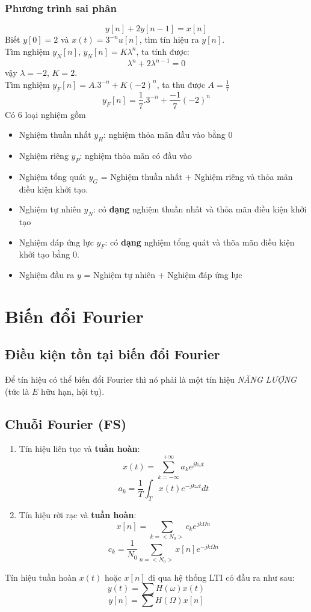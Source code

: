 \documentclass{article}
\begin{document}
\subsubsection{Phương trình sai phân}
$$y[n]+2y[n-1]=x[n]$$
Biết $y[0]=2$ và $x(t)=3^{-n}u[n]$, tìm tín hiệu ra $y[n]$.
\\Tìm nghiệm $y_{N}[n]$, $y_{N}[n]=K\lambda^{n}$, ta tính được:
$$\lambda^{n}+2\lambda^{n-1}=0$$
vậy $\lambda=-2$, $K=2$.
\\Tìm nghiệm $y_{F}[n]=A.3^{-n}+K(-2)^n$, ta thu được $A=\frac{1}{7}$
$$y_{F}[n]=\frac{1}{7}.3^{-n}+\frac{-1}{7}(-2)^n$$
Có 6 loại nghiệm gồm
\begin{itemize}
    \item Nghiệm thuần nhất $y_{H}$: nghiệm thỏa mãn đầu vào bằng $0$
    \item Nghiệm riêng $y_{P}$: nghiệm thỏa mãn có đầu vào
    \item Nghiệm tổng quát $y_{G}$ = Nghiệm thuần nhất + Nghiệm riêng và thỏa mãn điều kiện khởi tạo.
    \item Nghiệm tự nhiên $y_{N}$: có \textbf{dạng} nghiệm thuần nhất và thỏa mãn điều kiện khởi tạo
    \item Nghiệm đáp ứng lực $y_{F}$: có \textbf{dạng} nghiệm tổng quát và thõa mãn điều kiện khởi tạo bằng $0$.
    \item Nghiệm đầu ra $y$ = Nghiệm tự nhiên + Nghiệm đáp ứng lực 
\end{itemize}
\section{Biến đổi Fourier}
\subsection{Điều kiện tồn tại biến đổi Fourier}
Để tín hiệu có thể biến đổi Fourier thì nó phải là một tín hiệu \textit{NĂNG LƯỢNG} (tức là $E$ hữu hạn, hội tụ).
\subsection{Chuỗi Fourier (FS)}
\begin{enumerate}
    \item Tín hiệu liên tục và \textbf{tuần hoàn}:
    $$x(t)=\sum_{k=-\infty}^{+\infty}a_{k}e^{jk\omega t}$$
    $$a_{k}=\frac{1}{T}\int_{T}x(t)e^{-jk\omega t}dt$$
    \item Tín hiệu rời rạc và \textbf{tuần hoàn}:
    $$x[n]=\sum_{k=<N_{0}>}c_{k}e^{jk\Omega n}$$
    $$c_{k}=\frac{1}{N_{0}}\sum_{n=<N_{0}>}x[n]e^{-jk\Omega n}$$
\end{enumerate}
Tín hiệu tuần hoàn $x(t)$ hoặc $x[n]$ đi qua hệ thống LTI có đầu ra như sau:
$$y(t)=\sum H(\omega)x(t)$$
$$y[n]=\sum H(\Omega)x[n]$$
\end{document}
